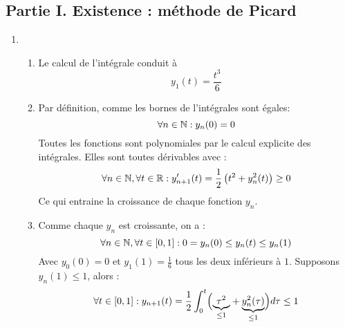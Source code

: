 \subsection*{Partie I. Existence : méthode de Picard}
\begin{enumerate}
 \item \begin{enumerate}
 \item Le calcul de l'intégrale conduit à 
\begin{displaymath}
 y_1(t) = \frac{t^3}{6}
\end{displaymath}
\item Par définition, comme les bornes de l'intégrales sont égales:
\begin{displaymath}
 \forall n\in \mathbb{N} : y_n(0) = 0
\end{displaymath}
Toutes les fonctions sont polynomiales par le calcul explicite des intégrales. Elles sont toutes dérivables avec :
\begin{displaymath}
 \forall n\in \mathbb{N}, \forall t\in \mathbb{R} :
y_{n+1}'(t) = \frac{1}{2}\left( t^2 +y_n^2(t)\right) \geq 0
\end{displaymath}
Ce qui entraine la croissance de chaque fonction $y_n$.

\item Comme chaque $y_n$ est croissante, on a :
\begin{displaymath}
 \forall n\in \mathbb{N}, \forall t\in [0,1] :
0=y_n(0)\leq y_n(t)\leq y_n(1) 
\end{displaymath}
Avec $y_0(0)=0$ et $y_1(1)=\frac{1}{6}$ tous les deux inférieurs à $1$. Supposons $y_n(1)\leq 1$, alors :
\begin{displaymath}
 \forall t\in [0,1]:
y_{n+1}(t)=\frac{1}{2}\int_0^t \Bigl( \underset{\leq 1}{\underbrace{\tau^2}}+\underset{\leq 1}{\underbrace{y_n^2(\tau)}} \Bigr) d\tau \leq 1
\end{displaymath}
\end{enumerate}


\end{enumerate}
